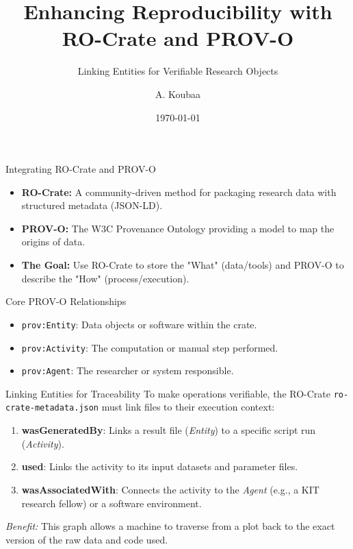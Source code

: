 \documentclass[aspectratio=169]{beamer}
\title{Enhancing Reproducibility with RO-Crate and PROV-O}
\subtitle{Linking Entities for Verifiable Research Objects}
\author{A. Koubaa}
\date{\today}
\begin{document}
\begin{frame}
\titlepage
\end{frame}

\begin{frame}{Integrating RO-Crate and PROV-O}
    \begin{itemize}
        \item \textbf{RO-Crate:} A community-driven method for packaging research data with structured metadata (JSON-LD).
        \item \textbf{PROV-O:} The W3C Provenance Ontology providing a model to map the origins of data.
        \item \textbf{The Goal:} Use RO-Crate to store the "What" (data/tools) and PROV-O to describe the "How" (process/execution).
    \end{itemize}
    \vspace{0.3cm}
    \begin{block}{Core PROV-O Relationships}
        \begin{itemize}
            \item \texttt{prov:Entity}: Data objects or software within the crate.
            \item \texttt{prov:Activity}: The computation or manual step performed.
            \item \texttt{prov:Agent}: The researcher or system responsible.
        \end{itemize}
    \end{block}
\end{frame}

\begin{frame}{Linking Entities for Traceability}
    To make operations verifiable, the RO-Crate \texttt{ro-crate-metadata.json} must link files to their execution context:
    \vfill
    \begin{enumerate}
        \item \textbf{wasGeneratedBy}: Links a result file (\textit{Entity}) to a specific script run (\textit{Activity}).
        \item \textbf{used}: Links the activity to its input datasets and parameter files.
        \item \textbf{wasAssociatedWith}: Connects the activity to the \textit{Agent} (e.g., a KIT research fellow) or a software environment.
    \end{enumerate}
    \vfill
    \textit{Benefit:} This graph allows a machine to traverse from a plot back to the exact version of the raw data and code used.
\end{frame}
\end{document}
